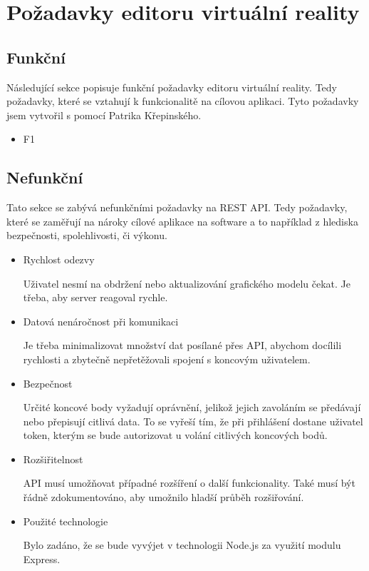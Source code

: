 \documentclass[thesis=B,czech]{FITthesis}[2012/06/26]
\begin{document}
    \section{Požadavky editoru virtuální reality}
        \subsection{Funkční}
            Následující sekce popisuje funkční požadavky editoru virtuální reality. Tedy požadavky, které se vztahují k funkcionalitě na cílovou aplikaci. Tyto požadavky jsem vytvořil s pomocí Patrika Křepinského.
            \begin{itemize}
                \item F1
            \end{itemize}
        \subsection{Nefunkční}
            Tato sekce se zabývá nefunkčními požadavky na REST API. Tedy požadavky, které se zaměřují na nároky cílové aplikace na software a to například z hlediska bezpečnosti, spolehlivosti, či výkonu.
            \begin{itemize}
                \item Rychlost odezvy

                    Uživatel nesmí na obdržení nebo aktualizování grafického modelu čekat. Je třeba, aby server reagoval rychle.
                \item Datová nenáročnost při komunikaci

                    Je třeba minimalizovat množství dat posílané přes API, abychom docílili rychlosti a zbytečně nepřetěžovali spojení s koncovým uživatelem.
                \item Bezpečnost
                    
                    Určité koncové body vyžadují oprávnění, jelikož jejich zavoláním se předávají nebo přepisují citlivá data. To se vyřeší tím, že při přihlášení dostane uživatel token, kterým se bude autorizovat u volání citlivých koncových bodů.
                \item Rozšiřitelnost

                    API musí umožňovat případné rozšíření o další funkcionality. Také musí být řádně zdokumentováno, aby umožnilo hladší průběh rozšiřování.
                \item Použité technologie

                    Bylo zadáno, že se bude vyvýjet v technologii Node.js za využití modulu Express.
            \end{itemize}
\end{document}
